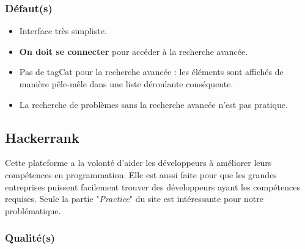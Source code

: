 \subsubsection*{Défaut(s)}

\begin{itemize}
    \item Interface très simpliste.
    \item \textbf{On doit se connecter} pour accéder à la recherche avancée.
    \item Pas de \gls{tagCat} pour la recherche avancée : les éléments sont affichés de manière pêle-mêle dans une liste déroulante conséquente.
    \item La recherche de problèmes sans la recherche avancée n'est pas pratique.
\end{itemize}

\subsection*{Hackerrank}

Cette plateforme a la volonté d'aider les développeurs à améliorer leurs compétences en programmation. Elle est aussi faite pour que les grandes entreprises puissent facilement trouver des développeurs ayant les compétences requises. Seule la partie "\textit{Practice}" du site est intéressante pour notre problématique.

\subsubsection*{Qualité(s)}

